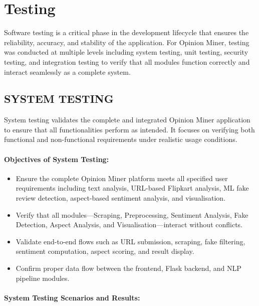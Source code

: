 \documentclass[12pt,a4paper]{report}
\begin{document}
\chapter{Testing}

Software testing is a critical phase in the development lifecycle that ensures the reliability, accuracy, and stability of the application. For Opinion Miner, testing was conducted at multiple levels including system testing, unit testing, security testing, and integration testing to verify that all modules function correctly and interact seamlessly as a complete system.

\section{SYSTEM TESTING}

System testing validates the complete and integrated Opinion Miner application to ensure that all functionalities perform as intended. It focuses on verifying both functional and non-functional requirements under realistic usage conditions.

\subsubsection*{Objectives of System Testing:}

\begin{itemize}
  \item Ensure the complete Opinion Miner platform meets all specified user requirements including text analysis, URL-based Flipkart analysis, ML fake review detection, aspect-based sentiment analysis, and visualisation.
  \item Verify that all modules---Scraping, Preprocessing, Sentiment Analysis, Fake Detection, Aspect Analysis, and Visualisation---interact without conflicts.
  \item Validate end-to-end flows such as URL submission, scraping, fake filtering, sentiment computation, aspect scoring, and result display.
  \item Confirm proper data flow between the frontend, Flask backend, and NLP pipeline modules.
\end{itemize}

\subsubsection*{System Testing Scenarios and Results:}
\end{document}
